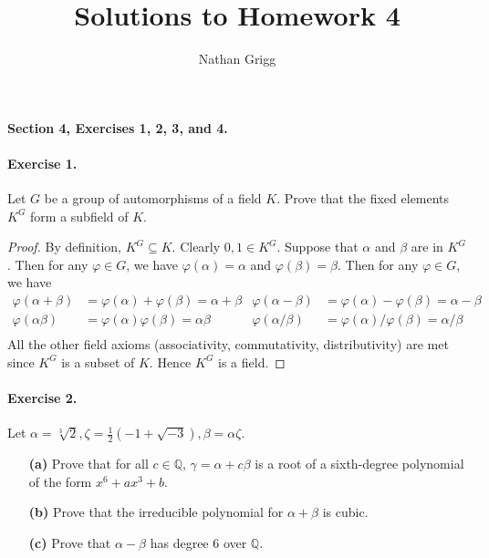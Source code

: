 \documentclass{article}
\title{Solutions to Homework 4}
\author{Nathan Grigg}
\date{}
\newcommand{\Q}{\mathbb Q}
\begin{document}
\maketitle
{\noindent\bf Section 4, Exercises 1, 2, 3, and 4.}

\paragraph{Exercise 1.}  Let $G$ be a group of automorphisms of a field $K$. Prove that the fixed elements $K^G$ form a subfield of $K$.

\begin{proof}
By definition, $K^G\subseteq K$. Clearly $0,1\in K^G$. Suppose that $\alpha$ and $\beta$ are in $K^G$. Then for any $\varphi\in G$, we have $\varphi(\alpha)=\alpha$ and $\varphi(\beta)=\beta$. Then for any $\varphi\in G$, we have
\begin{align*}
\varphi(\alpha+\beta)&= \varphi(\alpha)+\varphi(\beta)=\alpha+\beta &
\varphi(\alpha-\beta)&= \varphi(\alpha)-\varphi(\beta)=\alpha-\beta \\
\varphi(\alpha\beta)&= \varphi(\alpha)\varphi(\beta)=\alpha\beta &
\varphi(\alpha/\beta)&= \varphi(\alpha)/\varphi(\beta)=\alpha/\beta \\
\end{align*}
All the other field axioms (associativity, commutativity,
distributivity) are met since $K^G$ is a subset of $K$. Hence $K^G$ is a field.
\end{proof}

\paragraph{Exercise 2.} Let $\alpha=\sqrt[3]{2}, \zeta=\frac12(-1+\sqrt{-3}), \beta=\alpha\zeta$.
\begin{itemize}
\item[{\bf(a)}] Prove that for all $c\in \Q$, $\gamma=\alpha+c\beta$ is a root of a sixth-degree polynomial of the form $x^6+ax^3+b$.
\item[{\bf(b)}] Prove that the irreducible polynomial for $\alpha+\beta$ is cubic.
\item[{\bf(c)}] Prove that $\alpha-\beta$ has degree 6 over $\Q$.
\end{itemize}
\end{document}
